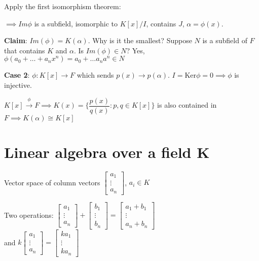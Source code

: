 \documentclass[twoside, 10pt]{article}
\newcommand{\Ker}{\text{Ker}}
\begin{document}
Apply the first isomorphism theorem:


$\implies Im\phi$ is a subfield, isomorphic to $K[x]/I$, contains $J$, $\alpha = \phi(x)$. 

\textbf{Claim}: $Im(\phi) = K(\alpha)$. Why is it the smallest?
Suppose $N$ is a subfield of $F$ that contains $K$ and $\alpha$. Is $Im(\phi) \in N$? Yes, $\phi(a_0 + \ldots + a_nx^n) = a_0 + \ldots a_na^n \in N$

\textbf{Case 2}: $\phi: K[x] \to F$ which sends $p(x) \to p(\alpha)$. $I = \Ker\phi = 0 \implies \phi$ is injective. 

$K[x] \stackrel{\phi}{\to} F \implies K(x) = \{ \dfrac{p(x)}{q(x)}: p, q \in K[x]\}$ is also contained in $F \implies K(\alpha) \cong K[x]$

\section{Linear algebra over a field K}
Vector space of column vectors $\begin{bmatrix}
    a_1\\
    \vdots\\
    a_n
\end{bmatrix}$, $a_i \in K$

Two operations: $\begin{bmatrix}
    a_1\\
    \vdots\\
    a_n
\end{bmatrix} + \begin{bmatrix}
    b_1\\
    \vdots\\
    b_n
\end{bmatrix} = \begin{bmatrix}
    a_1+b_1\\
    \vdots\\
    a_n+b_n
\end{bmatrix}$\\
and $k \begin{bmatrix}
    a_1\\
    \vdots\\
    a_n
\end{bmatrix} = \begin{bmatrix}
    ka_1\\
    \vdots\\
    ka_n
\end{bmatrix}$
\end{document}
